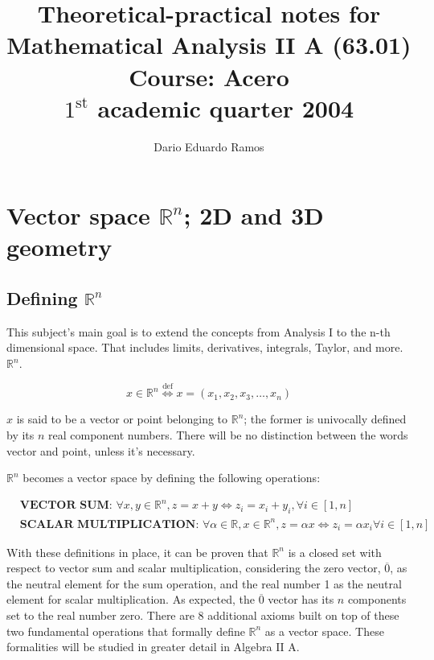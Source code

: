 \documentclass{article}
\title{Theoretical-practical notes for \\ Mathematical Analysis II A (63.01) \\ Course: Acero \\ $1^{\text{st}}$ academic quarter 2004}
\author{Dario Eduardo Ramos}
\renewcommand{\Bbb}{\mathbb}
\begin{document}
\maketitle

\tableofcontents{}
\newpage


\section{Vector space \texorpdfstring{$\Bbb R^n$}{Rn}; 2D and 3D geometry}

\subsection{Defining \texorpdfstring{$\Bbb R^n$}{Rn}}

This subject's main goal is to extend the concepts from Analysis I to the n-th dimensional space. That includes limits, derivatives, integrals, Taylor, and more.
$\mathbb{R}^n$.

\begin{equation}
x \in \Bbb R^n \overset{\text{def}}{\Longleftrightarrow} x = (x_1, x_2, x_3, \ldots, x_n)
\end{equation}

$x$ is said to be a vector or point belonging to $\Bbb R^n$; the former is univocally defined by its $n$ real component numbers. There will be no distinction between the words vector and point, unless it's necessary.

$\Bbb R^n$ becomes a vector space by defining the following operations:

\begin{subequations}
\begin{align}
& \textbf{VECTOR SUM: } \forall x, y \in \Bbb R^n, z = x + y \Longleftrightarrow z_i = x_i + y_i, \forall i \in [1, n] \\
& \textbf{SCALAR MULTIPLICATION: } \forall \alpha \in \Bbb R, x \in \Bbb R^n, z = \alpha x \Longleftrightarrow z_i = \alpha x_i \forall i \in [1, n]
\end{align}
\end{subequations}

With these definitions in place, it can be proven that $\Bbb R^n$ is a closed set with respect to vector sum and scalar multiplication, considering the zero vector, $\overline{0}$, as the neutral element for the sum operation, and the real number 1 as the neutral element for scalar multiplication. As expected, the $\overline{0}$ vector has its $n$ components set to the real number zero. There are 8 additional axioms built on top of these two fundamental operations that formally define $\Bbb R^n$ as a vector space. These formalities will be studied in greater detail in Algebra II A.
\end{document}
